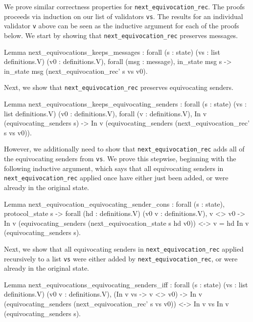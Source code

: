 \documentclass[runningheads]{llncs}
\begin{document}
We prove similar correctness properties for \verb|next_equivocation_rec|. The proofs proceeds via induction on our list of validators \verb|vs|. The results for an individual validator \verb|v| above can be seen as the inductive argument for each of the proofs below.
We start by showing that \verb|next_equivocation_rec| preserves messages.
\begin{coq}
Lemma next_equivocations_keeps_messages :
	forall (s : state) (vs : list definitions.V)
				 (v0 : definitions.V),
	forall (msg : message),
	in_state msg s ->
	in_state msg (next_equivocation_rec' s vs v0).
\end{coq}
Next, we show that \verb|next_equivocation_rec| preserves equivocating senders.
\begin{coq}
	Lemma next_equivocations_keeps_equivocating_senders :
	forall (s : state) (vs : list definitions.V)
			 	 (v0 : definitions.V),
	forall (v : definitions.V),
	In v (equivocating_senders s) ->
	In v (equivocating_senders (next_equivocation_rec' s vs v0)).
\end{coq}
However, we additionally need to show that \verb|next_equivocation_rec| adds all of the equivocating senders from \verb|vs|. We prove this stepwise, beginning with the following inductive argument, which says that all equivocating senders in \verb|next_equivocation_rec| applied once have either just been added, or were already in the original state.
\begin{coq}
Lemma next_equivocation_equivocating_sender_cons :
	forall (s : state),
	protocol_state s ->
	forall (hd : definitions.V) (v0 v : definitions.V),
	v <> v0 ->
	In v (equivocating_senders (next_equivocation_state s hd v0))
	<->
	v = hd \/ In v (equivocating_senders s).
\end{coq}
Next, we show that all equivocating senders in \verb|next_equivocation_rec| applied recursively to a list \verb|vs| were either added by \verb|next_equivocation_rec|, or were already in the original state.
\begin{coq}
Lemma next_equivocations_equivocating_senders_iff :
	forall (s : state) (vs : list definitions.V)
				 (v0 v : definitions.V),
	(In v vs -> v <> v0) ->
	In v (equivocating_senders (next_equivocation_rec' s vs v0))
	<->
	In v vs \/ In v (equivocating_senders s).
\end{coq}
\end{document}
